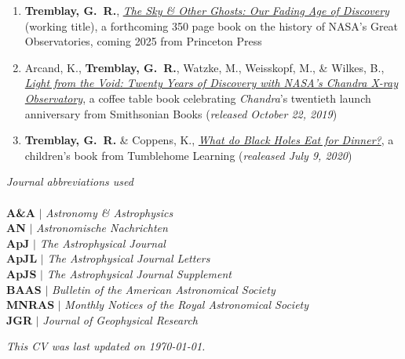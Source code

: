 \documentclass[11pt]{article}
\begin{document}
\begin{enumerate}

\item \textbf{Tremblay, G.~R.}, \ul{\textit{The Sky \& Other Ghosts: Our Fading Age of Discovery}} (working title), a forthcoming 350 page book on the history of NASA's Great Observatories, coming 2025 from Princeton Press

\item Arcand, K., \textbf{Tremblay, G.~R.}, Watzke, M., Weisskopf, M., \& Wilkes, B., \ul{\textit{Light from the Void: Twenty Years of Discovery with NASA's Chandra X-ray Observatory}}, a coffee table book celebrating \textit{Chandra}'s
twentieth launch anniversary from Smithsonian Books (\textit{released October 22, 2019})

\item \textbf{Tremblay, G.~R.} \& Coppens, K., \uline{\textit{What do Black Holes Eat for Dinner?}}, a children's book from Tumblehome Learning (\textit{realeased July 9, 2020})

\end{enumerate}


\noindent \textit{Journal abbreviations used}\\ \\
\textbf{A\&A} $|$ \textit{Astronomy \& Astrophysics}\\
\textbf{AN} $|$ \textit{Astronomische Nachrichten} \\
\textbf{ApJ} $|$ \textit{The Astrophysical Journal}\\
\textbf{ApJL} $|$ \textit{The Astrophysical Journal Letters}\\
\textbf{ApJS} $|$ \textit{The Astrophysical Journal Supplement}\\
\textbf{BAAS} $|$ \textit{Bulletin of the American Astronomical Society}\\
\textbf{MNRAS} $|$ \textit{Monthly Notices of the Royal Astronomical Society}\\
\textbf{JGR} $|$ \textit{Journal of Geophysical Research}\\






\vfill

\begin{center}
\noindent \textit{This CV was last updated on \today.}
\end{center}
\end{document}
